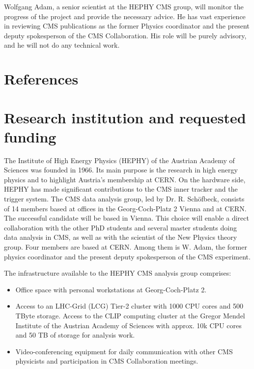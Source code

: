 \documentclass[a4paper,11pt]{article}
\begin{document}
Wolfgang Adam, a senior scientist at the HEPHY CMS group, will monitor the progress of the project and provide the necessary advice. He has vast experience in reviewing CMS publications as the former Physics coordinator and the present deputy spokesperson of the CMS Collaboration. His role will be purely advisory, and he will not do any technical work.

\appendix
\renewcommand{\thesection}{Annex \arabic{section}} 

\clearpage
\section{References}
\renewcommand{\refname}{}
{
%


}

\newpage

\section{Research institution and requested funding}

The Institute of High Energy Physics (HEPHY) of the Austrian Academy of Sciences was founded in 1966. 
Its main purpose is the research in high energy physics and to highlight Austria's membership at CERN. 
On the hardware side, HEPHY has made significant contributions to the CMS inner tracker and the trigger system. 
The CMS data analysis group, led by Dr. R. Sch{\"o}fbeck, consists of 14 members based at offices in the Georg-Coch-Platz 2 Vienna and at CERN. The successful candidate will be based in Vienna. 
This choice will enable a direct collaboration with the other PhD students and several master students doing data analysis in CMS, as well as with the scientist of the New Physics theory group.
Four members are based at CERN. 
Among them is  W. Adam, the former physics coordinator and the present deputy spokesperson of the CMS experiment.

The infrastructure available to the HEPHY CMS analysis group comprises:
\begin{itemize}
\item Office space with personal workstations at Georg-Coch-Platz 2.
\item Access to an LHC-Grid (LCG) Tier-2 cluster with 1000 CPU cores and 500 TByte storage. Access to the CLIP computing cluster at the Gregor Mendel Institute of the Austrian Academy of Sciences with approx. 10k CPU cores and 50 TB of
storage for analysis work.
\item Video-conferencing equipment for daily communication with other CMS physicists and participation in CMS Collaboration meetings.
\end{itemize}
\end{document}
